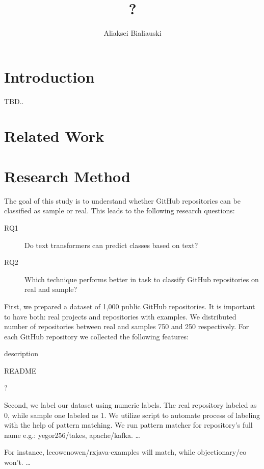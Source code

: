 \documentclass[sigplan,nonacm,review]{acmart}
\title{?}
\author{Aliaksei Bialiauski}
\affiliation{
    \institution{?}
    \city{Minsk}
    \country{Belarus}
}
\begin{document}
\maketitle


\section{Introduction}\label{sec:introduction}
TBD.. \citet{testCitation}


\section{Related Work}\label{sec:related}


\section{Research Method}\label{sec:method}
The goal of this study is to understand whether GitHub repositories can be
classified as sample or real. This leads to the following research questions:
\begin{description}
    \item[RQ1] Do text transformers can predict classes based on text?
    \item[RQ2] Which technique performs better in task to classify GitHub repositories on real and sample?
\end{description}

First, we prepared a dataset of 1,000 public GitHub repositories.
It is important to have both: real projects and repositories with examples.
We distributed number of repositories between real and samples 750 and 250
respectively. For each GitHub repository we collected the following features:
\begin{inparaenum}[1)]
    \item description
    \item README
    \item ?
\end{inparaenum}

Second, we label our dataset using numeric labels. The real repository labeled
as 0, while sample one labeled as 1. We utilize script to automate process of
labeling with the help of pattern matching. We run pattern matcher for
repository's full name e.g.: yegor256/takes, apache/kafka. \ldots

For instance, leeowenowen/rxjava-examples will match, while objectionary/eo won't.
\ldots
\end{document}
